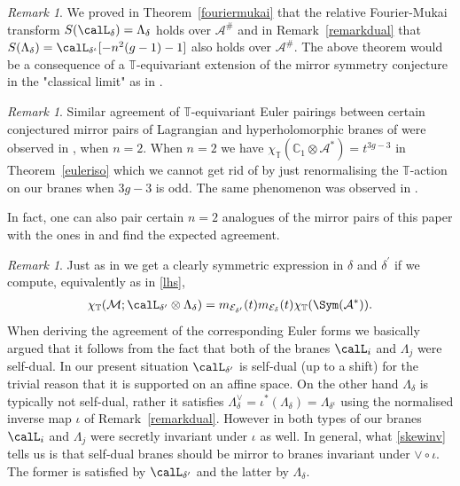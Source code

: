 \documentclass[12pt]{article}
\numberwithin{equation}{section}
\theoremstyle{remark}
\newtheorem{remark}[theorem]{Remark}
\theoremstyle{definition}
\numberwithin{theorem}{section}
\def\beq{\begin{eqnarray}}
\def\eeq{\end{eqnarray}}
\def\calE{{\mathcal E}}
\def\C{\mathbb{C}}
\def\M{{\mathcal{M}}}
\def\calA{{\mathcal{A}}}
\newcommand{\T}{{\mathbb{T}}}
\def\d{{{\delta}}}
\renewcommand{\1}{\mathbbm{1}}
\begin{document}
\begin{remark} We proved in Theorem~\ref{fouriermukai} that the relative Fourier-Mukai transform $S(\calL_{\d})=\Lambda_{\d}$ holds over $\calA^\#$ and in Remark~\ref{remarkdual} that  $S(\Lambda_{\d})=\calL_{\d^\iota}[-n^2(g-1)-1]$ also holds over $\calA^\#$. The above theorem  would be a consequence  of a $\T$-equivariant extension of  the mirror symmetry conjecture in the "classical limit"  as in \cite[Conjecture 2.5]{donagi-pantev}. 
\end{remark}

\begin{remark} Similar agreement of $\T$-equivariant Euler pairings between certain conjectured mirror pairs of Lagrangian and hyperholomorphic branes of \cite{hitchin2} were observed 
	in \cite[\S 7]{hausel-mellit-pei}, when $n=2$. When $n=2$ we have $\chi_\T(\C_1\otimes \calA^*)=t^{3g-3}$ in Theorem~\ref{euleriso} which we cannot get rid of by just renormalising the $\T$-action on our branes when $3g-3$ is odd. The same phenomenon was observed in \cite[Remark 7.7]{hausel-mellit-pei}. 
	
	In fact, one can also pair certain $n=2$ analogues of the mirror pairs of this paper with the ones in \cite{hausel-mellit-pei} and find the expected agreement. 
	
\end{remark}

\begin{remark} Just as in \cite[Corollary 4.11]{hausel-mellit-pei} we get a clearly symmetric expression in $\d$ and $\d^\prime$ if we compute, equivalently as in  \eqref{lhs},
	\beq	\label{tensorsym}\chi_\T(\M;\calL_{\d^\prime}\otimes \Lambda_{\d})=m_{\calE_{\d^\prime}}(t)m_{\calE_{\d}}(t)\chi_\T(\Sym(\calA^*)).\eeq When deriving the agreement of the corresponding Euler forms \cite[Corollary 7.1]{hausel-mellit-pei} we basically argued that it follows from the fact that both of the branes $\calL_i$ and $\Lambda_j$ were self-dual. In our present situation ${\calL_{\d^\prime}}$ is self-dual (up to a shift) for the trivial reason that it is supported on an affine space. On the other hand $\Lambda_{\d}$ is typically not self-dual, rather it satisfies $\Lambda^\vee_{\d}=\iota^*(\Lambda_{\d})=\Lambda_{\d^\iota}$ using the normalised inverse map $\iota$ of Remark~\ref{remarkdual}.  However in \cite{hausel-mellit-pei} both types of our branes $\calL_i$ and $\Lambda_j$ were secretly invariant under $\iota$ as well. In general, what \eqref{skewinv} tells us is that self-dual branes should be mirror to branes invariant under $\vee \circ \iota$. The former is satisfied by $\calL_{\d^\prime}$ and the latter by $\Lambda_{\d}$. 
\end{remark}
\end{document}
